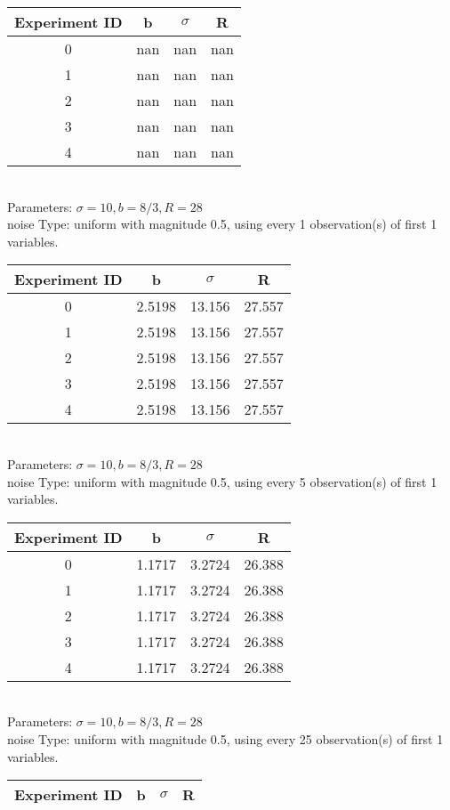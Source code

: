 \begin{multicols}{3}
\begin{tabular}{cccc}
\hline Experiment ID & b & $\sigma$ & R \\ \hline 
0 & nan & nan & nan\\ \hline 
 1 & nan & nan & nan\\ \hline 
 2 & nan & nan & nan\\ \hline 
 3 & nan & nan & nan\\ \hline 
 4 & nan & nan & nan\\ \hline 
 \end{tabular}\\
Parameters: $\sigma=10, b=8/3, R=28$\\
noise Type: uniform with magnitude 0.5, using every 1 observation(s) of first 1 variables.\\
\begin{tabular}{cccc}
\hline Experiment ID & b & $\sigma$ & R \\ \hline 
0 & 2.5198 & 13.156 & 27.557\\ \hline 
 1 & 2.5198 & 13.156 & 27.557\\ \hline 
 2 & 2.5198 & 13.156 & 27.557\\ \hline 
 3 & 2.5198 & 13.156 & 27.557\\ \hline 
 4 & 2.5198 & 13.156 & 27.557\\ \hline 
 \end{tabular}\\
Parameters: $\sigma=10, b=8/3, R=28$\\
noise Type: uniform with magnitude 0.5, using every 5 observation(s) of first 1 variables.\\
\begin{tabular}{cccc}
\hline Experiment ID & b & $\sigma$ & R \\ \hline 
0 & 1.1717 & 3.2724 & 26.388\\ \hline 
 1 & 1.1717 & 3.2724 & 26.388\\ \hline 
 2 & 1.1717 & 3.2724 & 26.388\\ \hline 
 3 & 1.1717 & 3.2724 & 26.388\\ \hline 
 4 & 1.1717 & 3.2724 & 26.388\\ \hline 
 \end{tabular}\\
Parameters: $\sigma=10, b=8/3, R=28$\\
noise Type: uniform with magnitude 0.5, using every 25 observation(s) of first 1 variables.\\
\begin{tabular}{cccc}
\hline Experiment ID & b & $\sigma$ & R \\ \hline 

\end{tabular}
\end{multicols}
